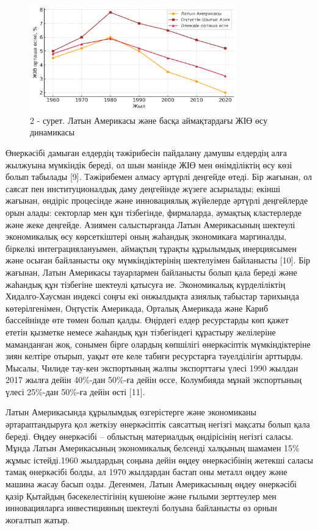\begin{figure}[H]
	\centering
	\includegraphics[width=0.8\textwidth]{media/ekon2/image52}
	\caption*{2 - сурет. Латын Америкасы және басқа аймақтардағы ЖІӨ өсу динамикасы}
\end{figure}

\begin{multicols}{2}
Өнеркәсібі дамыған елдердің тәжірибесін пайдалану дамушы елдердің алға
жылжуына мүмкіндік береді, ол шын мәнінде ЖІӨ мен өнімділіктің өсу көзі
болып табылады {[}9{]}. Тәжірибемен алмасу әртүрлі деңгейде өтеді. Бір
жағынан, ол саясат пен институционалдық даму деңгейінде жүзеге
асырылады; екінші жағынан, өндіріс процесінде және инновациялық
жүйелерде әртүрлі деңгейлерде орын алады: секторлар мен құн тізбегінде,
фирмаларда, аумақтық кластерлерде және жеке деңгейде. Азиямен
салыстырғанда Латын Америкасының шектеулі экономикалық өсу көрсеткіштері
оның жаһандық экономикаға маргиналды, біркелкі интеграциялануымен,
аймақтың тұрақты құрылымдық инерциясымен және осыған байланысты оқу
мүмкіндіктерінің шектелуімен байланысты {[}10{]}. Бір жағынан, Латын
Америкасы тауарлармен байланысты болып қала береді және жаһандық құн
тізбегіне шектеулі қатысуға ие. Экономикалық күрделіліктің
Хидалго-Хаусман индексі соңғы екі онжылдықта азиялық табыстар тарихында
көтерілгенімен, Оңтүстік Америкада, Орталық Америкада және Кариб
бассейнінде өте төмен болып қалды. Өңірдегі елдер ресурстарды көп қажет
ететін қызметке немесе жаһандық құн тізбегіндегі құрастыру желілеріне
маманданған жоқ, сонымен бірге олардың көпшілігі өнеркәсіптік
мүмкіндіктеріне зиян келтіре отырып, уақыт өте келе табиғи ресурстарға
тәуелділігін арттырды. Мысалы, Чилиде тау-кен экспортының жалпы
экспорттағы үлесі 1990 жылдан 2017 жылға дейін 40\%-дан 50\%-ға дейін
өссе, Колумбияда мұнай экспортының үлесі 25\%-дан 50\%-ға дейін өсті
{[}11{]}.

Латын Америкасында құрылымдық өзгерістерге және экономиканы
әртараптандыруға қол жеткізу өнеркәсіптік саясаттың негізгі мақсаты
болып қала береді. Өңдеу өнеркәсібі -- облыстың материалдық өндірісінің
негізгі саласы. Мұнда Латын Америкасының экономикалық белсенді халқының
шамамен 15\% жұмыс істейді.1960 жылдардың соңына дейін өңдеу
өнеркәсібінің жетекші саласы тамақ өнеркәсібі болды, ал 1970 жылдардан
бастап оны металл өңдеу және машина жасау басып озды. Дегенмен, Латын
Америкасының өңдеу өнеркәсібі қазір Қытайдың бәсекелестігінің күшеюіне
және ғылыми зерттеулер мен инновацияларға инвестицияның шектеулі болуына
байланысты өз орнын жоғалтып жатыр.
\end{multicols}

